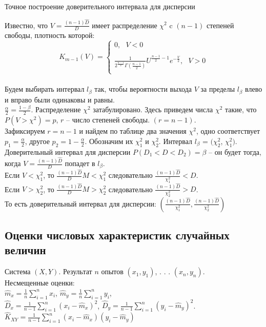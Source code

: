 \documentclass[russian, 12pt, fleqn]{article}
\begin{document}
\begin{center}
$\textbf{Точное построение доверительного интервала для дисперсии}$
\end{center}
Известно, что $V = \frac{(n-1)\hat{D}}{D}$ имеет распределение $\chi^2$ c $(n-1)$ степеней свободы, плотность которой:\\
\noindent
\begin{equation*} 
K_{m - 1}(V)=
 \begin{cases}
   0 ,\ \ \  V < 0\\
	\\
   \frac{1}{  2 ^{ { \frac{n - 1}{2}  }}  \Gamma(\frac{n - 1}{2})} U^{\frac{n - 1}{2} - 1}e^{-\frac{V}{2}}    , \ \ \ V > 0\\
 \end{cases}
\end{equation*}\\

Будем выбирать интервал $l_\beta$ так, чтобы вероятности выхода $V$ за пределы  $l_\beta$ влево и вправо были одинаковы  и равны.\\
$\frac{\alpha}{2} = \frac{1 - \beta}{2}$. Распределение $\chi^2$ затабулировано. Здесь приведем числа $\chi^2$ такие, что $P(V> \chi^2) = p$, $r$ -- число степеней свободы.
$(r = n - 1)$.\\
Зафиксируем $r = n - 1$ и найдем по таблице два значения  $\chi^2$, одно соответствует $p_1 = \frac{\alpha}{2}$, другое $p_2 = 1 - \frac{\alpha}{2}$. Обозначим их $\chi_1^2$ и  $\chi_2^2$. Интервал $l_\beta$ = $ (\chi_2^2$, $\chi_1^2)$.\\
Доверительный интервал для дисперсии $P(D_1 < D < D_2) = \beta$ -- он будет тогда, когда $V = \frac{(n - 1) \hat{D}}{D}$ попадет в $l_\beta$.\\
Если $V < \chi_1^2$, то $\frac{(n - 1) \hat{D}}{D}M  < \chi_1^2$ следовательно $\frac{(n - 1) \hat{D}}{\chi_1^2} < D$.\\
Если $V > \chi_2^2$, то $\frac{(n - 1) \hat{D}}{D}M  > \chi_2^2$ следовательно $\frac{(n - 1) \hat{D}}{\chi_2^2} > D$.\\
То есть доверительный интервал для дисперсии: $\displaystyle{\left(\frac{(n - 1) \hat{D}}{\chi_1^2}, \frac{(n - 1) \hat{D}}{\chi_2^2}\right)}$
\subsection{Оценки числовых характеристик случайных величин}
Система $(X, Y)$. Результат $n$ опытов $(x_1, y_1)$, . . . $(x_n, y_n)$.\\
Несмещенные оценки:\\
$\hat{m}_x= \frac{1}{n} \displaystyle{\sum\limits_{i = 1} ^{n}} x_i$,  $\hat{m}_y= \frac{1}{n} \displaystyle{\sum\limits_{i = 1} ^{n}} y_i$,\\
$\hat{D}_x = \frac{1}{n - 1} \displaystyle{\sum\limits_{i = 1} ^{n}} (x_i - \hat{m}_x)^2$, 
$\hat{D}_y  = \frac{1}{n - 1} \displaystyle{\sum\limits_{i = 1} ^{n}} (y_i - \hat{m}_y)^2$.\\
$\hat{K}_{XY} = \frac{1}{n - 1} \displaystyle{\sum\limits_{i = 1} ^{n}} (x_i - \hat{m}_x) (y_i - \hat{m}_y)$ 
\end{document}
